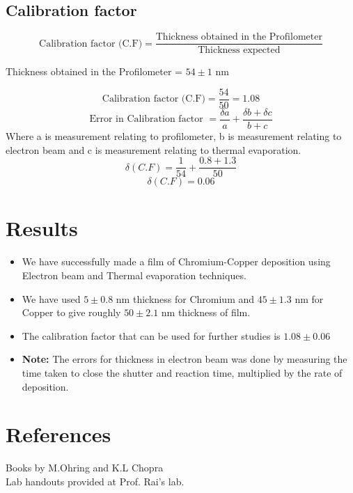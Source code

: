 \documentclass[]{report}[12 pt]
\begin{document}
\subsection*{Calibration factor}

\[ \text{Calibration factor (C.F)}= \frac{\text{Thickness obtained in the Profilometer}}{\text{Thickness expected}}\]

Thickness obtained in the Profilometer = $54 \pm 1 $ nm

\[ \text{Calibration factor (C.F)}= \frac{54}{50} = 1.08\]
\[\text{Error in Calibration factor }= \frac{\delta a}{a}+\frac{\delta b + \delta c}{b+c}\]
Where a is measurement relating to profilometer, b is measurement relating to electron beam and c is measurement relating to thermal evaporation.
\[\delta (C.F) =  \frac{1}{54}+\frac{0.8 + 1.3}{50}\]
\[\delta (C.F) =  0.06\]

\section*{Results}
\begin{itemize}
	\item We have successfully made a film of Chromium-Copper deposition using Electron beam and Thermal evaporation techniques.
	\item We have used $5\pm 0.8$ nm thickness for Chromium and $45 \pm 1.3$ nm for Copper to give roughly $50 \pm 2.1$ nm thickness of film. 
	\item The calibration factor that can be used for further studies is $1.08 \pm 0.06$ 
	\item \textbf{Note: }The errors for thickness in electron beam was done by measuring the time taken to close the shutter and reaction time, multiplied by the rate of deposition.
\end{itemize}

\section*{References}
Books by M.Ohring and K.L Chopra\\
Lab handouts provided at Prof. Rai's lab.
\end{document}
